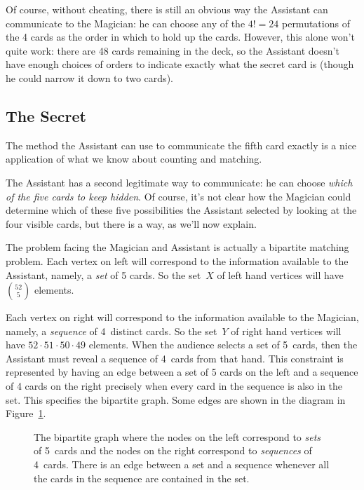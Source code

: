 Of course, without cheating, there is still an obvious way the Assistant
can communicate to the Magician: he can choose any of the $4! = 24$
permutations of the 4 cards as the order in which to hold up the cards.
However, this alone won't quite work: there are 48 cards remaining in the
deck, so the Assistant doesn't have enough choices of orders to indicate
exactly what the secret card is (though he could narrow it down to two
cards).

\subsection{The Secret}

The method the Assistant can use to communicate the fifth card exactly is
a nice application of what we know about counting and matching.

The Assistant has a second legitimate way to communicate: he can
choose \emph{which of the five cards to keep hidden}.  Of course, it's
not clear how the Magician could determine which of these five
possibilities the Assistant selected by looking at the four visible
cards, but there is a way, as we'll now explain.

The problem facing the Magician and Assistant is actually a bipartite
matching problem.  Each vertex on left will correspond to the
information available to the Assistant, namely, a \emph{set} of 5
cards.  So the set~$X$ of left hand vertices will have $\binom{52}{5}$
elements.  

Each vertex on right will correspond to the information available to
the Magician, namely, a \emph{sequence} of 4~distinct cards.  So the
set~$Y$ of right hand vertices will have $52\cdot 51 \cdot 50 \cdot
49$ elements.  When the audience selects a set of 5~cards, then the
Assistant must reveal a sequence of 4~cards from that hand.  This
constraint is represented by having an edge between a set of 5 cards
on the left and a sequence of 4 cards on the right precisely when
every card in the sequence is also in the set.  This specifies the
bipartite graph.  Some edges are shown in the diagram in
Figure~\ref{fig:11Q9}.

\begin{figure}


\caption{The bipartite graph where the nodes on the left correspond to
  \emph{sets} of 5~cards and the nodes on the right correspond to
  \emph{sequences} of 4~cards. There is an edge between a set and a
  sequence whenever all the cards in the sequence are contained in the
  set.}

\label{fig:11Q9}

\end{figure}

